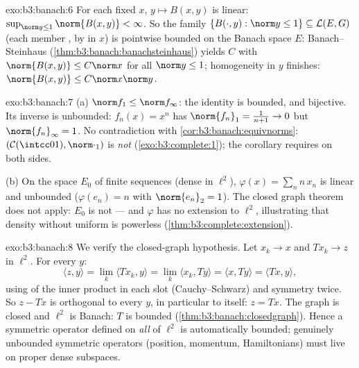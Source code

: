 \begin{solution}{exo:b3:banach:6}
For each fixed $x$, $y \mapsto B(x, y)$ is  linear:
$\sup_{\norm y \leq 1}\norm{B(x,y)} < \infty$. So the family
$\{B(\cdot, y) : \norm y \leq 1\} \subseteq \mathcal L(E, G)$
(each member , by  in $x$) is pointwise
bounded on the Banach space $E$: Banach--Steinhaus
(\cref{thm:b3:banach:banachsteinhaus}) yields $C$ with
$\norm{B(x,y)} \leq C\norm x$ for all $\norm y \leq 1$;
homogeneity in $y$ finishes: $\norm{B(x,y)} \leq
C\norm x\norm y$.
\end{solution}

\begin{solution}{exo:b3:banach:7}
(a) $\norm f_1 \leq \norm f_\infty$: the identity is bounded,
and bijective. Its inverse is unbounded: $f_n(x) = x^n$ has
$\norm{f_n}_1 = \frac1{n+1} \to 0$ but $\norm{f_n}_\infty = 1$.
No contradiction with \cref{cor:b3:banach:equivnorms}: $(\mathcal
C(\intcc01), \norm\cdot_1)$ is \emph{not} 
(\cref{exo:b3:complete:1}); the corollary requires 
on both sides.

(b) On the space $E_0$ of finite sequences (dense in $\ell^2$),
$\varphi(x) = \sum_n n\,x_n$ is linear and unbounded
($\varphi(e_n) = n$ with $\norm{e_n}_2 = 1$). The closed graph
theorem does not apply: $E_0$ is not  --- and $\varphi$
has no  extension to $\ell^2$, illustrating that
density without uniform  is powerless
(\cref{thm:b3:complete:extension}).
\end{solution}

\begin{solution}{exo:b3:banach:8}
We verify the closed-graph hypothesis. Let $x_k \to x$ and
$Tx_k \to z$ in $\ell^2$. For every $y$:
\[
\langle z, y\rangle = \lim_k\langle Tx_k, y\rangle
= \lim_k \langle x_k, Ty\rangle = \langle x, Ty\rangle
= \langle Tx, y\rangle,
\]
using  of the inner product in each slot
(Cauchy--Schwarz) and symmetry twice. So $z - Tx$ is orthogonal
to every $y$, in particular to itself: $z = Tx$. The graph is
closed and $\ell^2$ is Banach: $T$ is bounded
(\cref{thm:b3:banach:closedgraph}). Hence a symmetric operator
defined on \emph{all} of $\ell^2$ is automatically bounded;
genuinely unbounded symmetric operators (position, momentum,
Hamiltonians) must live on proper dense subspaces.
\end{solution}

